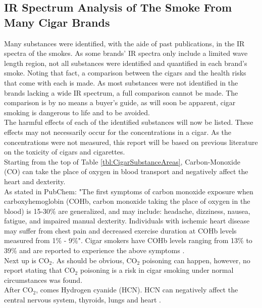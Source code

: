 \documentclass[reprint,amsmath,amssymb,aps, prl,superscriptaddress]{revtex4-2}
\begin{document}
\subsection{IR Spectrum Analysis of The Smoke From Many Cigar Brands}
Many substances were identified, with the aide of past publications, in the IR spectra of the smokes. As some brands' IR spectra only include a limited wave length region, not all substances were identified and quantified in each brand's smoke.
Noting that fact, a comparison between the cigars and the health risks that come with each is made. As most substances were not identified in the brands lacking a wide IR spectrum, a full comparison cannot be made. The comparison is by no means a buyer's guide, as will soon be apparent, cigar smoking is dangerous to life and to be avoided.\\
The harmful effects of each of the identified substances will now be listed. These effects may not necessarily occur for the concentrations in a cigar. As the concentrations were not measured, this report will be based on previous literature on the toxicity of cigars and cigarettes.\\
Starting from the top of Table \ref{tbl:CigarSubstanceAreas}, Carbon-Monoxide (CO) can take the place of oxygen in blood transport and negatively affect the heart \cite{SubstanceDangerPaper} and dexterity.\\
As stated in PubChem\cite{PubChemCO}: "The first symptoms of carbon monoxide exposure when carboxyhemoglobin (COHb, carbon monoxide taking the place of oxygen in the blood) is 15-30$\%$ are generalized, and may include: headache, dizziness, nausea, fatigue, and impaired manual dexterity. Individuals with ischemic heart disease may suffer from chest pain and decreased exercise duration at COHb levels measured from 1$\%$ - 9$\%$". Cigar smokers have COHb levels ranging from 13\% to 39\% and are reported to experience the above symptoms \cite{COHbInSmokers}.\\
Next up is $\text{CO}_{2}$. As should be obvious, $\text{CO}_{2}$ poisoning can happen, however, no report stating that $\text{CO}_{2}$ poisoning is a risk in cigar smoking under normal circumstances was found. \\
After $\text{CO}_{2}$, comes Hydrogen cyanide (HCN). HCN can negatively affect the central nervous system, thyroids, lungs and heart \cite{SubstanceDangerPaper}\cite{PubChemHCN}.\\
\end{document}
